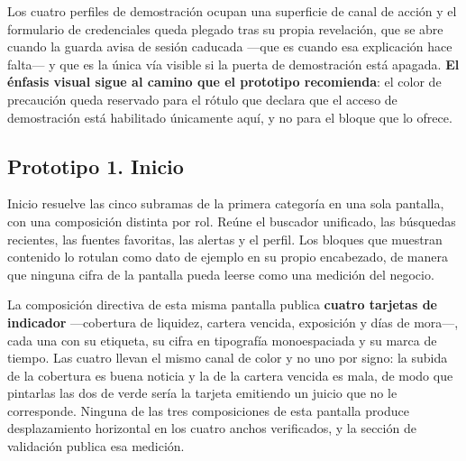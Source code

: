 Los cuatro perfiles de demostración ocupan una superficie de canal de acción y el formulario de
credenciales queda plegado tras su propia revelación, que se abre cuando la guarda avisa de sesión
caducada ---que es cuando esa explicación hace falta--- y que es la única vía visible si la puerta
de demostración está apagada. \textbf{El énfasis visual sigue al camino que el prototipo
recomienda}: el color de precaución queda reservado para el rótulo que declara que el acceso de
demostración está habilitado únicamente aquí, y no para el bloque que lo ofrece.


\clearpage
\subsection{Prototipo 1. Inicio}

Inicio resuelve las cinco subramas de la primera categoría en una sola pantalla, con una composición
distinta por rol. Reúne el buscador unificado, las búsquedas recientes, las fuentes favoritas, las
alertas y el perfil. Los bloques que muestran contenido lo rotulan como dato de ejemplo en su propio
encabezado, de manera que ninguna cifra de la pantalla pueda leerse como una medición del negocio.


La composición directiva de esta misma pantalla publica \textbf{cuatro tarjetas de indicador}
---cobertura de liquidez, cartera vencida, exposición y días de mora---, cada una con su etiqueta,
su cifra en tipografía monoespaciada y su marca de tiempo. Las cuatro llevan el mismo canal de color
y no uno por signo: la subida de la cobertura es buena noticia y la de la cartera vencida es mala,
de modo que pintarlas las dos de verde sería la tarjeta emitiendo un juicio que no le corresponde.
Ninguna de las tres composiciones de esta pantalla produce desplazamiento horizontal en los cuatro
anchos verificados, y la sección de validación publica esa medición.

